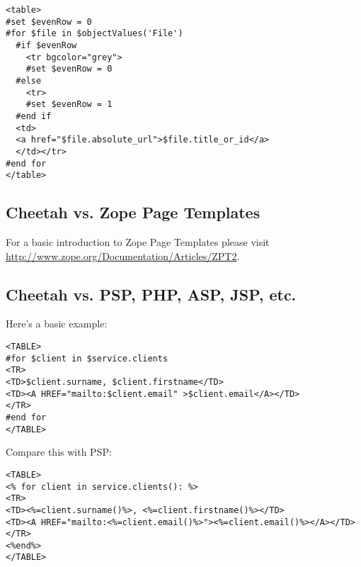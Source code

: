 \begin{verbatim}
<table>
#set $evenRow = 0
#for $file in $objectValues('File')
  #if $evenRow
    <tr bgcolor="grey">
    #set $evenRow = 0
  #else
    <tr>
    #set $evenRow = 1
  #end if
  <td>
  <a href="$file.absolute_url">$file.title_or_id</a>
  </td></tr>
#end for
</table>
\end{verbatim}

\subsection{Cheetah vs. Zope Page Templates}
\label{comparisons.zpt}

For a basic introduction to Zope Page Templates please visit
\url{http://www.zope.org/Documentation/Articles/ZPT2}.

\subsection{Cheetah vs. PSP, PHP, ASP, JSP, etc.}
\label{comparisons.pspEtc}

Here's a basic example:
\begin{verbatim}
<TABLE>
#for $client in $service.clients
<TR>
<TD>$client.surname, $client.firstname</TD>
<TD><A HREF="mailto:$client.email" >$client.email</A></TD>
</TR>
#end for
</TABLE>
\end{verbatim}

Compare this with PSP:

\begin{verbatim}
<TABLE>
<% for client in service.clients(): %>
<TR>
<TD><%=client.surname()%>, <%=client.firstname()%></TD>
<TD><A HREF="mailto:<%=client.email()%>"><%=client.email()%></A></TD>
</TR>
<%end%>
</TABLE>
\end{verbatim}


